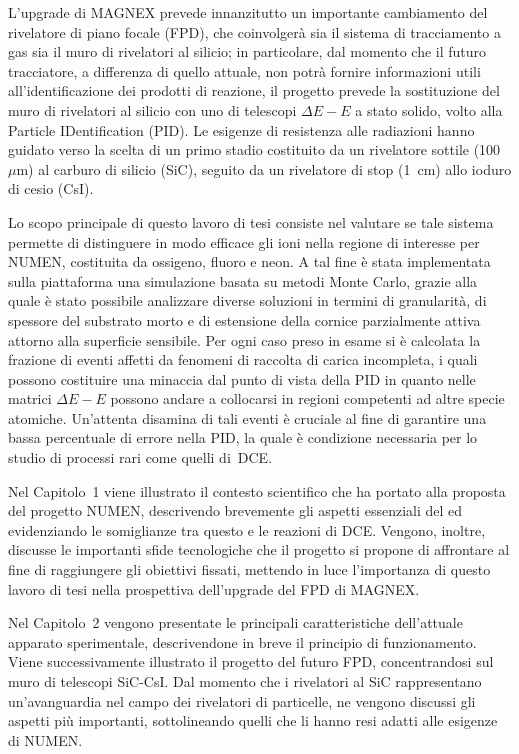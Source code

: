 L'upgrade di MAGNEX prevede innanzitutto un importante cambiamento del rivelatore di piano focale (FPD), che coinvolgerà sia il sistema di tracciamento a gas sia il muro di rivelatori al silicio; in particolare, dal momento che il futuro tracciatore, a differenza di quello attuale, non potrà fornire informazioni utili all'identificazione dei prodotti di reazione, il progetto prevede la sostituzione del muro di rivelatori al silicio con uno di telescopi $\Delta E - E$ a stato solido, volto alla Particle IDentification (PID). 
Le esigenze di resistenza alle radiazioni hanno guidato verso la scelta di un primo stadio costituito da un rivelatore sottile (100~$\mu$m) al carburo di silicio (SiC), seguito da un rivelatore di stop (1~cm) allo ioduro di cesio (CsI).

Lo scopo principale di questo lavoro di tesi consiste nel valutare se tale sistema permette di distinguere in modo efficace gli ioni nella regione di interesse per NUMEN, costituita da ossigeno, fluoro e neon.
A tal fine è stata implementata sulla piattaforma \geant{} una simulazione basata su metodi Monte Carlo, grazie alla quale è stato possibile analizzare diverse soluzioni in termini di granularità, di spessore del substrato morto e di estensione della cornice parzialmente attiva attorno alla superficie sensibile.
Per ogni caso preso in esame si è calcolata la frazione di eventi affetti da fenomeni di raccolta di carica incompleta, i quali possono costituire una minaccia dal punto di vista della PID in quanto nelle matrici $\Delta E - E$ possono andare a collocarsi in regioni competenti ad altre specie atomiche.
Un'attenta disamina di tali eventi è cruciale al fine di garantire una bassa percentuale di errore nella PID, la quale è condizione necessaria per lo studio di processi rari come quelli di~DCE.


Nel Capitolo~1 viene illustrato il contesto scientifico che ha portato alla proposta del progetto NUMEN, descrivendo brevemente gli aspetti essenziali del \doppiobeta{} ed evidenziando le somiglianze tra questo e le reazioni di DCE.
Vengono, inoltre, discusse le importanti sfide tecnologiche che il progetto si propone di affrontare al fine di raggiungere gli obiettivi fissati, mettendo in luce l'importanza di questo lavoro di tesi nella prospettiva dell'upgrade del FPD di MAGNEX.


Nel Capitolo~2 vengono presentate le principali caratteristiche dell'attuale apparato sperimentale, descrivendone in breve il principio di funzionamento.
Viene successivamente illustrato il progetto del futuro FPD, concentrandosi sul muro di telescopi SiC-CsI.
Dal momento che i rivelatori al SiC rappresentano un'avanguardia nel campo dei rivelatori di particelle, ne vengono discussi gli aspetti più importanti, sottolineando quelli che li hanno resi adatti alle esigenze di NUMEN.


